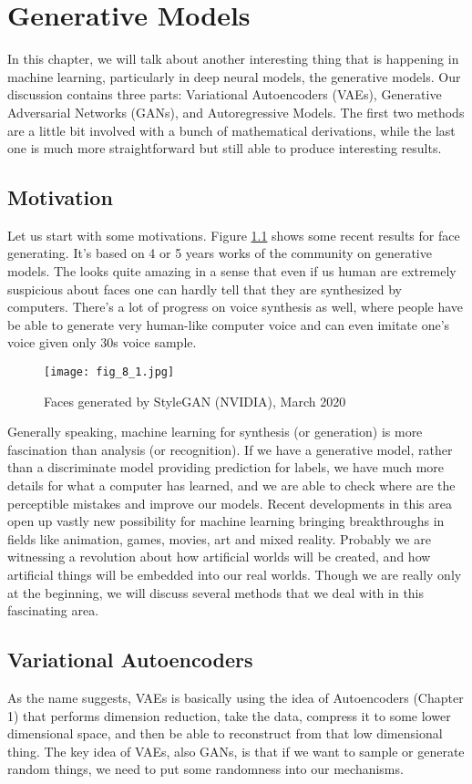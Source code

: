 \documentclass[../book-template.tex]{subfiles}
\begin{document}
\chapter{Generative Models}
In this chapter, we will talk about another interesting thing that is happening in machine learning, particularly in deep neural models, the generative models. Our discussion contains three parts: Variational Autoencoders (VAEs),  Generative Adversarial Networks (GANs), and Autoregressive Models. The first two methods are a little bit involved with a bunch of mathematical derivations, while the last one is much more straightforward but still able to produce interesting results. 
\section{Motivation}
Let us start with some motivations. Figure \ref{fig_8_1} shows some recent results for face generating. It's based on 4 or 5 years works of the community on generative models. The looks quite amazing in a sense that even if us human are extremely suspicious about faces one can hardly tell that they are synthesized by computers. There's a lot of progress on voice synthesis as well, where people have be able to generate very human-like computer voice and can even imitate one's voice given only 30s voice sample.
\begin{figure}[h] 
	\centering 
	\texttt{[image: fig\_8\_1.jpg]} 
	\caption{Faces generated by StyleGAN (NVIDIA), March 2020}\label{fig_8_1}
\end{figure}
\par Generally speaking, machine learning for synthesis (or generation) is more fascination than analysis (or recognition). If we have a generative model, rather than a discriminate model providing prediction for labels, we have much more details for what a computer has learned, and we are able to check where are the perceptible mistakes and improve our models. Recent developments in this area open up vastly new possibility for machine learning bringing breakthroughs in fields like animation, games, movies, art and mixed reality. Probably we are witnessing a revolution about how artificial worlds will be created, and how artificial things will be embedded into our real worlds. Though we are really only at the beginning, we will discuss several methods that we deal with in this fascinating area.
\section{Variational Autoencoders}
As the name suggests, VAEs is basically using the idea of Autoencoders (Chapter 1) that performs dimension reduction, take the data, compress it to some lower dimensional space, and then be able to reconstruct from that low dimensional thing. The key idea of VAEs, also GANs, is that if we want to sample or generate random things, we need to put some randomness into our mechanisms. 
\end{document}
